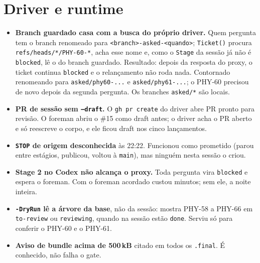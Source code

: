 \documentclass[11pt,a4paper]{article}
\begin{document}
\section{Driver e runtime}
\begin{itemize}
  \item \textbf{Branch guardado casa com a busca do próprio driver.} Quem
        pergunta tem o branch renomeado para
        \texttt{<branch>-asked-<quando>}; \texttt{Ticket()} procura
        \texttt{refs/heads/*/PHY-60-*}, acha esse nome e, como o
        \texttt{Stage} da sessão já não é \texttt{blocked}, lê o do branch
        guardado. Resultado: depois da resposta do proxy, o ticket continua
        \texttt{blocked} e o relançamento não roda nada. Contornado renomeando
        para \texttt{asked/phy60-...} e \texttt{asked/phy61-...}; o PHY-60
        precisou de novo depois da segunda pergunta. Os branches
        \texttt{asked/*} são locais.
  \item \textbf{PR de sessão sem \texttt{--draft}.} O \texttt{gh pr create} do
        driver abre PR pronto para revisão. O foreman abriu o \#15 como draft
        antes; o driver acha o PR aberto e só reescreve o corpo, e ele ficou
        draft nos cinco lançamentos.
  \item \textbf{\texttt{STOP} de origem desconhecida} às 22:22. Funcionou como
        prometido (parou entre estágios, publicou, voltou à \texttt{main}),
        mas ninguém nesta sessão o criou.
  \item \textbf{Stage 2 no Codex não alcança o proxy.} Toda pergunta vira
        \texttt{blocked} e espera o foreman. Com o foreman acordado custou
        minutos; sem ele, a noite inteira.
  \item \textbf{\texttt{-DryRun} lê a árvore da base}, não da sessão: mostra
        PHY-58 a PHY-66 em \texttt{to-review} ou \texttt{reviewing}, quando na
        sessão estão \texttt{done}. Serviu só para conferir o PHY-60 e o
        PHY-61.
  \item \textbf{Aviso de bundle acima de 500\,kB} citado em todos os
        \texttt{.final}. É conhecido, não falha o gate.
\end{itemize}
\end{document}

